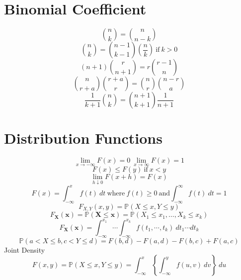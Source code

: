 \documentclass[twocolumn]{amsart}
\renewcommand{\P}{\mathbb{P}}
\begin{document}
\section*{Binomial Coefficient}
\begin{equation*}
  \binom{n}{k} = \binom{n}{n-k}
\end{equation*}
\begin{equation*}
  \binom{n}{k} = \binom{n-1}{k-1} \left( \frac{n}{k} \right)~\text{if}~k > 0
\end{equation*}
\begin{equation*}
  (n+1)\binom{r}{n+1} = r\binom{r-1}{n}
\end{equation*}
\begin{equation*}
  \binom{n}{r+a}\binom{r+a}{r} = \binom{n}{r}\binom{n-r}{a}
\end{equation*}
\begin{equation*}
  \frac{1}{k+1}\binom{n}{k} = \binom{n+1}{k+1}\frac{1}{n+1}
\end{equation*}

\section*{Distribution Functions}
\begin{equation*}
  \lim_{x\to-\infty}F(x)=0~\lim_{x\to\infty}F(x)=1
\end{equation*}
\begin{equation*}
  F(x) \leq F(y)~\text{if}~x<y
\end{equation*}
\begin{equation*}
  \lim_{h \downarrow 0}F(x+h)=F(x)
\end{equation*}
\begin{equation*}
  F(x)=\int_{-\infty}^{x}f(t)~dt~\text{where}~f(t)\geq
  0~\text{and}\int_{-\infty}^{\infty}f(t)~dt = 1
\end{equation*}
\begin{equation*}
  F_{X,Y}(x,y)=\P(X\leq x,Y\leq y)
\end{equation*}
\begin{equation*}
  F_{\boldsymbol{X}}(\boldsymbol{x})=\P(\boldsymbol{X}\leq\boldsymbol{x}) =
  \P(X_{1}\leq x_{1},\ldots,X_{k}\leq x_{k})
\end{equation*}
\begin{equation*}
  F_{\boldsymbol{X}}(\boldsymbol{x})=\int_{-\infty}^{x_{1}}\dotsi
  \int_{-\infty}^{x_{k}}f(t_{1},\cdots,t_{k})~dt_{1}\dotsm dt_{k}
\end{equation*}
\begin{equation*}
  \P(a < X \leq b, c < Y \leq d) = F(b,d) - F(a,d) - F(b,c) + F(a,c)
\end{equation*}
Joint Density
\begin{equation*}
  F(x,y) = \P(X \leq x,Y \leq y) = \int_{-\infty}^{x}\left\{ \int_{-\infty}^{y}
    f(u,v)~dv\right\}~du
\end{equation*}
\end{document}
